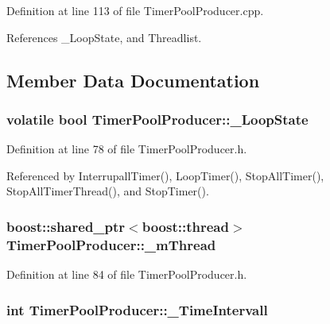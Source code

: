 \-Definition at line 113 of file \-Timer\-Pool\-Producer.\-cpp.



\-References \-\_\-\-Loop\-State, and \-Threadlist.



\subsection{\-Member \-Data \-Documentation}
\hypertarget{classTimerPoolProducer_a0819a9b4ae21ef164a7953308a6eba32}{
\subsubsection[{\-\_\-\-Loop\-State}]{\setlength{\rightskip}{0pt plus 5cm}volatile bool {\bf \-Timer\-Pool\-Producer\-::\-\_\-\-Loop\-State}}}\label{classTimerPoolProducer_a0819a9b4ae21ef164a7953308a6eba32}


\-Definition at line 78 of file \-Timer\-Pool\-Producer.\-h.



\-Referenced by \-Interrupall\-Timer(), \-Loop\-Timer(), \-Stop\-All\-Timer(), \-Stop\-All\-Timer\-Thread(), and \-Stop\-Timer().

\hypertarget{classTimerPoolProducer_a26517aaf30ea382756cca86b719e07ea}{
\subsubsection[{\-\_\-m\-Thread}]{\setlength{\rightskip}{0pt plus 5cm}boost\-::shared\-\_\-ptr$<$boost\-::thread$>$ {\bf \-Timer\-Pool\-Producer\-::\-\_\-m\-Thread}}}\label{classTimerPoolProducer_a26517aaf30ea382756cca86b719e07ea}


\-Definition at line 84 of file \-Timer\-Pool\-Producer.\-h.

\hypertarget{classTimerPoolProducer_a414c9db407fb14cb1f0693951730567d}{
\subsubsection[{\-\_\-\-Time\-Intervall}]{\setlength{\rightskip}{0pt plus 5cm}int {\bf \-Timer\-Pool\-Producer\-::\-\_\-\-Time\-Intervall}}}\label{classTimerPoolProducer_a414c9db407fb14cb1f0693951730567d}


